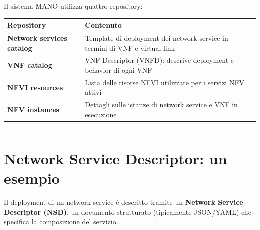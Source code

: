 \documentclass[
  italian,
  openany]{book}
\newcounter{none} %
\begin{document}
Il sistema MANO utilizza quattro repository:

{\def\LTcaptype{none} %
\begin{longtable}[]{@{}
  >{\raggedright\arraybackslash}p{}
  >{\raggedright\arraybackslash}p{}@{}}
\toprule\noalign{}
\begin{minipage}[b]{\linewidth}\raggedright
Repository
\end{minipage} & \begin{minipage}[b]{\linewidth}\raggedright
Contenuto
\end{minipage} \\
\midrule\noalign{}
\endhead
\bottomrule\noalign{}
\endlastfoot
\textbf{Network services catalog} & Template di deployment dei network
service in termini di VNF e virtual link \\
\textbf{VNF catalog} & VNF Descriptor (VNFD): descrive deployment e
behavior di ogni VNF \\
\textbf{NFVI resources} & Lista delle risorse NFVI utilizzate per i
servizi NFV attivi \\
\textbf{NFV instances} & Dettagli sulle istanze di network service e VNF
in esecuzione \\
\end{longtable}
}

\begin{center}\rule{0.5\linewidth}{0.5pt}\end{center}

\section{Network Service Descriptor: un
esempio}\label{network-service-descriptor-un-esempio}

Il deployment di un network service è descritto tramite un
\textbf{Network Service Descriptor (NSD)}, un documento strutturato
(tipicamente JSON/YAML) che specifica la composizione del servizio.
\end{document}
